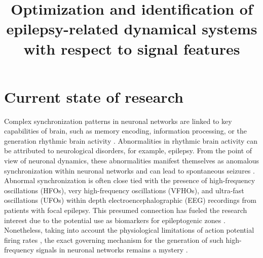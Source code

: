 \documentclass[a4paper,11pt]{scrartcl}
\title{Optimization and identification of epilepsy-related dynamical systems with respect to signal features}
\begin{document}
\maketitle
\tableofcontents

\newpage

\section{Current state of research}\label{sec:state}



Complex synchronization patterns in neuronal networks are linked to key capabilities of brain, such as memory encoding, information processing, or the generation rhythmic brain activity \cite{Izhikevich2006, Song2018}. Abnormalities in rhythmic brain activity can be attributed to neurological disorders, for example, epilepsy. From the point of view of neuronal dynamics, these abnormalities manifest themselves as anomalous synchronization within neuronal networks and can lead to spontaneous seizures \cite{Jiruska2013}. Abnormal synchronization is often close tied with the presence of high-frequency oscillations (HFOs), very high-frequency oscillations (VFHOs), and ultra-fast oscillations (UFOs) within depth electroencephalographic (EEG) recordings from patients with focal epilepsy. This presumed connection has fueled the research interest due to the potential use as biomarkers for epileptogenic zones \cite{Jacobs2008, Worrell2011, Staba2011, Jacobs2012, Zijlmans2012, Brazdil2017, Cimbalnik2018, Cimbalnik2020, Brazdil2023}. Nonetheless, taking into account the physiological limitations of action potential firing rates \cite{Gabbiani2010}, the exact governing mechanism for the generation of such high-frequency signals in neuronal networks remains a mystery \cite{Jiruska2017}.
\end{document}

